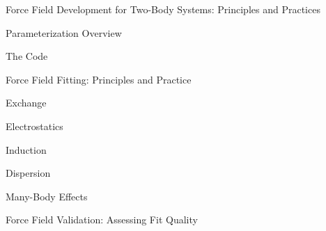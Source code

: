 
\begin{chapter}{Force Field Development for Two-Body Systems: Principles and
Practices}
\label{ch:pointer}

\newcommand{\vmultipolecolor}{\ensuremath{\sum\limits_{\textcolor{mon}{tu}}\textcolor{mon}{Q_t^i}T_{tu}\textcolor{mon}{Q_u^j}}\xspace}




\begin{section}{Parameterization Overview}

\end{section}

\begin{section}{The \pointer Code}
\label{sec:pointer-pointer}

\end{section}

\begin{section}{Force Field Fitting: Principles and Practice}
\label{sec:pointer-fitting}

\begin{subsection}{Exchange}
\label{sec:pointer-exchange}

\end{subsection}
\begin{subsection}{Electrostatics}
\label{sec:pointer-electrostatics}

\end{subsection}
\begin{subsection}{Induction}
\label{sec:pointer-induction}

\end{subsection}
\begin{subsection}{Dispersion}
\label{sec:pointer-dispersion}

\end{subsection}
\begin{subsection}{Many-Body Effects}
\label{sec:pointer-many_body_effects}

\end{subsection}
\end{section}

\begin{section}{Force Field Validation: Assessing Fit Quality}
\label{sec:pointer-validate}

\end{section}


\end{chapter}

